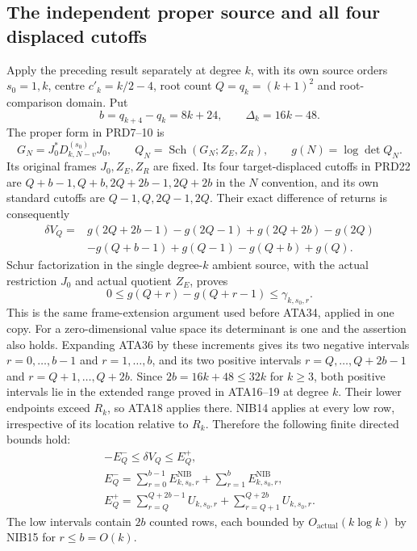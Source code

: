 \documentclass[11pt,a4paper]{article}
\begin{document}
\subsection{The independent proper source and all four displaced cutoffs}
Apply the preceding result separately at degree $k$, with its own
source orders $s_0=1,k$, centre $c'_k=k/2-4$, root count
$Q=q_k=(k+1)^2$ and root-comparison domain.  Put
\[
 b=q_{k+4}-q_k=8k+24,\qquad\Delta_k=16k-48.
\]
The proper form in PRD7--10 is
\[
 G_N=J_0^*D_{k,N-v}^{(s_0)}J_0,\qquad
 Q_N=\operatorname{Sch}(G_N;Z_E,Z_R),\qquad g(N)=\log\det Q_N.
                                                               \tag{ATA35}
\]
Its original frames $J_0,Z_E,Z_R$ are fixed.  Its four target-displaced
cutoffs in PRD22 are $Q+b-1,Q+b,2Q+2b-1,2Q+2b$ in the $N$
convention, and its own standard cutoffs are $Q-1,Q,2Q-1,2Q$.
Their exact difference of returns is consequently
\[
\begin{split}
 \delta V_Q={}&g(2Q+2b-1)-g(2Q-1)+g(2Q+2b)-g(2Q)\\
              &-g(Q+b-1)+g(Q-1)-g(Q+b)+g(Q).
\end{split}\tag{ATA36}
\]
Schur factorization in the single degree-$k$ ambient source, with
the actual restriction $J_0$ and actual quotient $Z_E$, proves
\[
 0\le g(Q+r)-g(Q+r-1)\le\gamma_{k,s_0,r}.              \tag{ATA37}
\]
This is the same frame-extension argument used before ATA34, applied
in one copy.  For a zero-dimensional value space its determinant is
one and the assertion also holds.
Expanding ATA36 by these increments gives its two negative intervals
$r=0,\ldots,b-1$ and $r=1,\ldots,b$, and its two positive intervals
$r=Q,\ldots,Q+2b-1$ and $r=Q+1,\ldots,Q+2b$.
Since $2b=16k+48\le32k$ for $k\ge3$, both positive intervals lie in
the extended range proved in ATA16--19 at degree $k$.
Their lower endpoints exceed $R_k$, so ATA18 applies there.
NIB14 applies at every low row, irrespective of its location relative
to $R_k$.  Therefore the following finite directed bounds hold:
\[
\begin{gathered}
 -E_Q^-\le\delta V_Q\le E_Q^+,\\
 E_Q^- =\sum_{r=0}^{b-1}E^{\mathrm{NIB}}_{k,s_0,r}
                   +\sum_{r=1}^{b}E^{\mathrm{NIB}}_{k,s_0,r},\\
 E_Q^+ =\sum_{r=Q}^{Q+2b-1}U_{k,s_0,r}
                   +\sum_{r=Q+1}^{Q+2b}U_{k,s_0,r}.
\end{gathered}\tag{ATA38}
\]
The low intervals contain $2b$ counted rows, each bounded by
$O_{\mathrm{actual}}(k\log k)$ by NIB15 for $r\le b=O(k)$.
\end{document}
